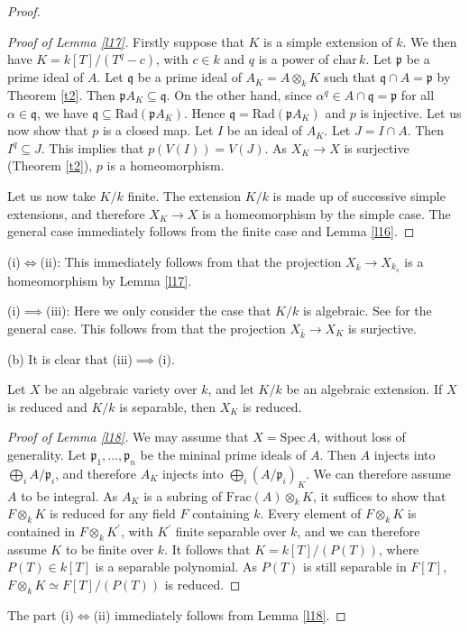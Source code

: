 \begin{proof}
\begin{proof}[Proof of Lemma \ref{l17}]
		Firstly suppose that $K$ is a simple extension of $k$. We then have $K=k[T]/(T^q-c)$, with $c\in k$ and $q$ is a power of $\mathrm{char}\,k$. Let $\mathfrak{p}$ be a prime ideal of $A$. Let $\mathfrak{q}$ be a prime ideal of $A_K=A\otimes_kK$ such that $\mathfrak{q}\cap A=\mathfrak{p}$ by Theorem \ref{t2}. Then $\mathfrak{p}A_K\subseteq\mathfrak{q}$. On the other hand, since $\alpha^q\in A\cap\mathfrak{q}=\mathfrak{p}$ for all $\alpha\in\mathfrak{q}$, we have $\mathfrak{q}\subseteq\mathrm{Rad}(\mathfrak{p}A_K)$. Hence $\mathfrak{q}=\mathrm{Rad}(\mathfrak{p}A_K)$ and $p$ is injective. Let us now show that $p$ is a closed map. Let $I$ be an ideal of $A_K$. Let $J=I\cap A$. Then $I^q\subseteq J$. This implies that $p(V(I))=V(J)$. As $X_K\to X$ is surjective (Theorem \ref{t2}), $p$ is a homeomorphism.
		
		Let us now take $K/k$ finite. The extension $K/k$ is made up of successive simple extensions, and therefore $X_K\to X$ is a homeomorphism by the simple case. The general case immediately follows from the finite case and Lemma \ref{l16}.
	\end{proof}
	(i)$\iff$(ii): This immediately follows from that the projection $X_{\bar{k}}\to X_{k_s}$ is a homeomorphism by Lemma \ref{l17}.
	
	(i)$\implies$(iii): Here we only consider the case that $K/k$ is algebraic. See \cite[\href{https://stacks.math.columbia.edu/tag/0364}{Tag 0364}, Lemma 33.8.8]{stacks-project} for the general case. This follows from that the projection $X_{\bar{k}}\to X_K$ is surjective.
	
	(b) It is clear that (iii)$\implies$(i).
	\begin{lm}
		\label{l18}
		Let $X$ be an algebraic variety over $k$, and let $K/k$ be an algebraic extension. If $X$ is reduced and $K/k$ is separable, then $X_K$ is reduced.
	\end{lm}
	\begin{proof}[Proof of Lemma \ref{l18}]
		We may assume that $X=\mathrm{Spec}\,A$, without loss of generality. Let $\mathfrak{p}_1,\dots,\mathfrak{p}_n$ be the mininal prime ideals of $A$. Then $A$ injects into $\bigoplus_iA/\mathfrak{p}_i$, and therefore $A_K$ injects into $\bigoplus_i(A/\mathfrak{p}_i)_K$. We can therefore assume $A$ to be integral. As $A_K$ is a subring of $\mathrm{Frac}(A)\otimes_kK$, it suffices to show that $F\otimes_kK$ is reduced for any field $F$ containing $k$. Every element of $F\otimes_kK$ is contained in $F\otimes_kK^{\prime}$, with $K^{\prime}$ finite separable over $k$, and we can therefore assume $K$ to be finite over $k$. It follows that $K=k[T]/(P(T))$, where $P(T)\in k[T]$ is a separable polynomial. As $P(T)$ is still separable in $F[T]$, $F\otimes_kK\simeq F[T]/(P(T))$ is reduced.
	\end{proof}
	The part (i)$\iff$(ii) immediately follows from Lemma \ref{l18}.
	

\end{proof}
